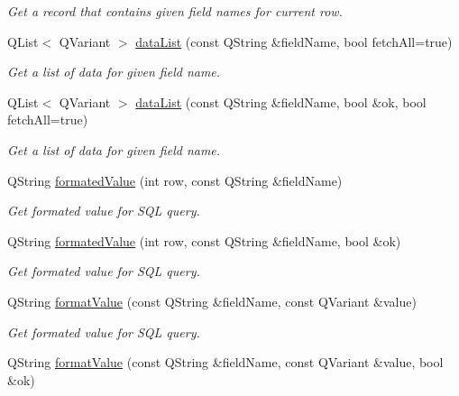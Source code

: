 \begin{DoxyCompactItemize}
\begin{DoxyCompactList}\small\item\em Get a record that contains given field names for current row. \end{DoxyCompactList}\item 
Q\-List$<$ Q\-Variant $>$ \hyperlink{classmdt_abstract_sql_table_controller_a46896c6920f306f2c2ad03281ec64c74}{data\-List} (const Q\-String \&field\-Name, bool fetch\-All=true)
\begin{DoxyCompactList}\small\item\em Get a list of data for given field name. \end{DoxyCompactList}\item 
Q\-List$<$ Q\-Variant $>$ \hyperlink{classmdt_abstract_sql_table_controller_a712e896a677fc0f6660305c35947ef9f}{data\-List} (const Q\-String \&field\-Name, bool \&ok, bool fetch\-All=true)
\begin{DoxyCompactList}\small\item\em Get a list of data for given field name. \end{DoxyCompactList}\item 
Q\-String \hyperlink{classmdt_abstract_sql_table_controller_ae904bcb5f6656e6f88a3c3c73191e337}{formated\-Value} (int row, const Q\-String \&field\-Name)
\begin{DoxyCompactList}\small\item\em Get formated value for S\-Q\-L query. \end{DoxyCompactList}\item 
Q\-String \hyperlink{classmdt_abstract_sql_table_controller_a359d809042ec35007a58dacb6a1172ea}{formated\-Value} (int row, const Q\-String \&field\-Name, bool \&ok)
\begin{DoxyCompactList}\small\item\em Get formated value for S\-Q\-L query. \end{DoxyCompactList}\item 
Q\-String \hyperlink{classmdt_abstract_sql_table_controller_a17b43facd84cd020c498ac3367b49595}{format\-Value} (const Q\-String \&field\-Name, const Q\-Variant \&value)
\begin{DoxyCompactList}\small\item\em Get formated value for S\-Q\-L query. \end{DoxyCompactList}\item 
Q\-String \hyperlink{classmdt_abstract_sql_table_controller_a1cd1d86cde47b62ca4a272f4334adf9d}{format\-Value} (const Q\-String \&field\-Name, const Q\-Variant \&value, bool \&ok)

\end{DoxyCompactItemize}
